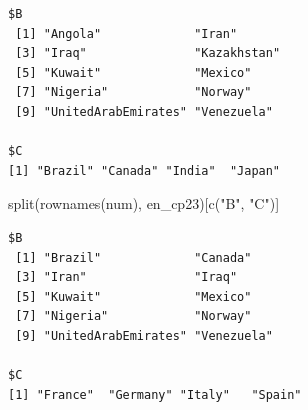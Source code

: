 \documentclass[oneside, openany, fontset=libertinus]{mitthesis}
\newenvironment{Shaded}{\begin{snugshade}}{\end{snugshade}}
\newcommand{\FunctionTok}[1]{\textcolor[rgb]{0.28,0.35,0.67}{#1}}
\newcommand{\NormalTok}[1]{\textcolor[rgb]{0.00,0.23,0.31}{#1}}
\newcommand{\StringTok}[1]{\textcolor[rgb]{0.13,0.47,0.30}{#1}}
\begin{document}
\begin{verbatim}
$B
 [1] "Angola"             "Iran"              
 [3] "Iraq"               "Kazakhstan"        
 [5] "Kuwait"             "Mexico"            
 [7] "Nigeria"            "Norway"            
 [9] "UnitedArabEmirates" "Venezuela"         

$C
[1] "Brazil" "Canada" "India"  "Japan" 
\end{verbatim}

\Needspace{1.71in}

\begin{Shaded}
\begin{Highlighting}[]
\FunctionTok{split}\NormalTok{(}\FunctionTok{rownames}\NormalTok{(num), en\_cp23)[}\FunctionTok{c}\NormalTok{(}\StringTok{"B"}\NormalTok{, }\StringTok{"C"}\NormalTok{)]}
\end{Highlighting}
\end{Shaded}

\begin{verbatim}
$B
 [1] "Brazil"             "Canada"            
 [3] "Iran"               "Iraq"              
 [5] "Kuwait"             "Mexico"            
 [7] "Nigeria"            "Norway"            
 [9] "UnitedArabEmirates" "Venezuela"         

$C
[1] "France"  "Germany" "Italy"   "Spain"  
\end{verbatim}
\end{document}
